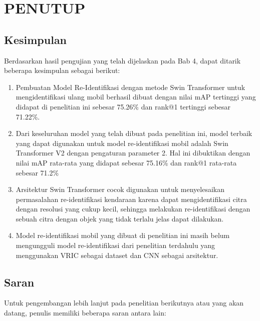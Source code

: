 \chapter{PENUTUP}
\label{chap:penutup}


\section{Kesimpulan}
\label{sec:kesimpulan}

Berdasarkan hasil pengujian yang telah dijelaskan pada Bab 4, dapat 
ditarik beberapa kesimpulan sebagai berikut:

\begin{enumerate}[nolistsep]

  \item Pembuatan Model Re-Identifikasi dengan metode Swin Transformer untuk 
  mengidentifikasi ulang mobil berhasil dibuat dengan nilai mAP tertinggi yang didapat 
  di penelitian ini sebesar 75.26\% dan rank@1 tertinggi sebesar 71.22\%.

  \item Dari keseluruhan model yang telah dibuat pada penelitian ini, 
  model terbaik yang dapat digunakan untuk model re-identifikasi mobil adalah 
  Swin Transformer V2 dengan pengaturan parameter 2. Hal ini dibuktikan dengan nilai 
  mAP rata-rata yang didapat sebesar 75.16\% dan rank@1 rata-rata sebesar 71.2\%

  \item Arsitektur Swin Transformer cocok digunakan untuk menyelesaikan permasalahan 
  re-identifikasi kendaraan karena dapat mengidentifikasi citra dengan resolusi yang cukup 
  kecil, sehingga melakukan re-identifikasi dengan sebuah citra dengan objek yang 
  tidak terlalu jelas dapat dilakukan.

  \item Model re-identifikasi mobil yang dibuat di penelitian ini masih belum mengungguli 
  model re-identifikasi dari penelitian terdahulu yang menggunakan VRIC sebagai dataset 
  dan CNN sebagai arsitektur.

\end{enumerate}

\section{Saran}
\label{chap:saran}

Untuk pengembangan lebih lanjut pada penelitian berikutnya atau yang akan datang, \linebreak
penulis memiliki beberapa saran antara lain:

